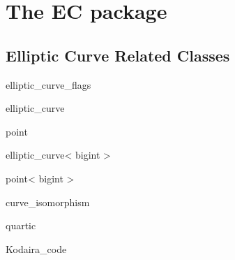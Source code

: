 %
%
%
%

\part*{The \LiDIA EC package}\label{LiDIA-EC}



\chapter{Elliptic Curve Related Classes}

\begin{class}{elliptic_curve_flags}
  
\end{class}

\begin{class}{elliptic_curve}
  
\end{class}

\begin{class}{point}
  
\end{class}

\begin{class}{elliptic_curve< bigint >}
  
\end{class}

\begin{class}{point< bigint >}
  
\end{class}

\begin{class}{curve_isomorphism}
  
\end{class}

\begin{class}{quartic}
  
\end{class}

\begin{class}{Kodaira_code}
  
\end{class}
